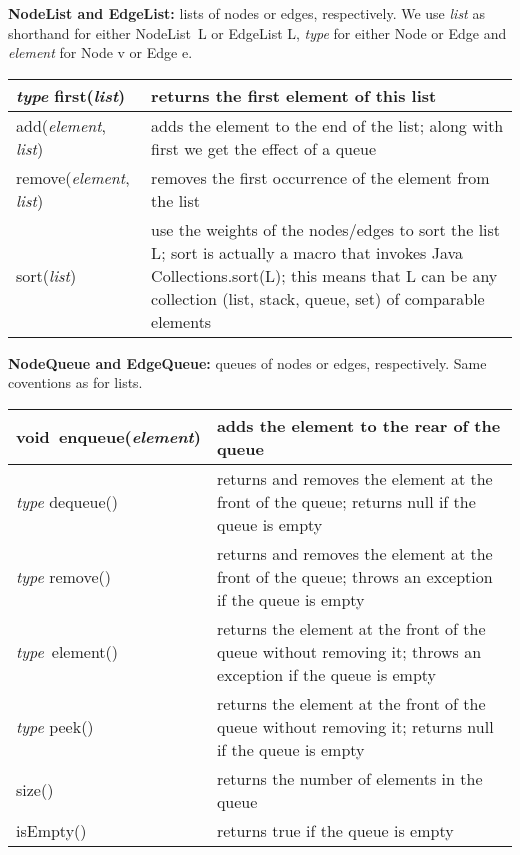 \begin{table}
  \small
  \textbf{NodeList and EdgeList:} lists of nodes or edges, respectively.
  We use \emph{list} as shorthand for either \textsf{NodeList~L} or
  \textsf{EdgeList L}, \emph{type} for either \textsf{Node} or \textsf{Edge}
  and \emph{element} for \textsf{Node v} or \textsf{Edge e}.
  
  \medskip
  \begin{tabular}{| m{} | m{} |}
    \hline
    \textsf{\emph{type} first(\emph{list})}
    &
    returns the first element of this list
    \\ \hline
    \textsf{add(\emph{element}, \emph{list})}
    &
    adds the element
    to the end of the list; along with \textsf{first}
    we get the effect of a queue
    \\ \hline
    \textsf{remove(\emph{element}, \emph{list})}
    &
    removes the first occurrence of the element from the list
    \\ \hline
    \textsf{sort(\emph{list})}
    &
    use the weights of the nodes/edges to sort the list \textsf{L};
    sort is actually a macro that invokes Java \textsf{Collections.sort(L)};
    this means that \textsf{L} can be any collection (list, stack, queue, set)
    of comparable elements
    \\ \hline
  \end{tabular}  
  
  \bigskip
  \textbf{NodeQueue and EdgeQueue:} queues of nodes or edges, respectively.
  Same coventions as for lists.

  \medskip
  \begin{tabular}{| m{} | m{} |}
    \hline
      \textsf{void~enqueue(\emph{element})}
    &
    adds the element to the rear of the queue
    \\ \hline
    \textsf{\emph{type} dequeue()}
    &
    returns and removes the element at the front of the queue;
    returns \textsf{null} if the queue is empty
    \\ \hline
    \textsf{\emph{type} remove()}
    &
    returns and removes the element at the front of the queue;
    throws an exception if the queue is empty
    \\ \hline
    \textsf{\emph{type}~element()}
    &
    returns the element at the front of the queue
    without removing it;
    throws an exception if the queue is empty
    \\ \hline
    \textsf{\emph{type} peek()}
    &
    returns the element at the front of the queue
    without removing it;
    returns \textsf{null} if the queue is empty
    \\ \hline
    \textsf{size()}
    &
    returns the number of elements in the queue
    \\ \hline
    \textsf{isEmpty()}
    &
    returns \textsf{true} if the queue is empty 
    \\ \hline
  \end{tabular}


\end{table}
